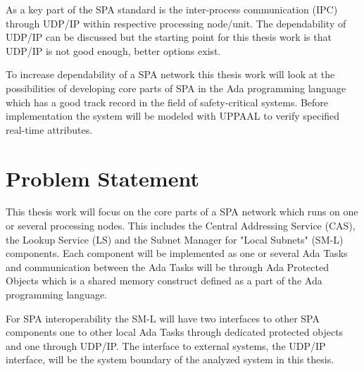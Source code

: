As a key part of the SPA standard is the inter-process communication (IPC)
through UDP/IP within respective processing node/unit. The dependability of
UDP/IP can be discussed but the starting point for this thesis work is that
UDP/IP is not good enough, better options exist.


To increase dependability of a SPA network this thesis work will look at the
possibilities of developing core parts of SPA in the Ada programming language
which has a good track record in the field of safety-critical systems. Before
implementation the system will be modeled with UPPAAL to verify specified
real-time attributes.

\section{Problem Statement}



This thesis work will focus on the core parts of a SPA network which runs on
one or several processing nodes. This includes the Central Addressing Service
(CAS), the Lookup Service (LS) and the Subnet Manager for "Local Subnets"
(SM-L) components. Each component will be implemented as one or several Ada
Tasks and communication between the Ada Tasks will be through Ada Protected
Objects which is a shared memory construct defined as a part of the Ada
programming language.

For SPA interoperability the SM-L will have two interfaces to other SPA
components one to other local Ada Tasks through dedicated protected objects and
one through UDP/IP. The interface to external systems, the UDP/IP interface,
will be the system boundary of the analyzed system in this thesis.


